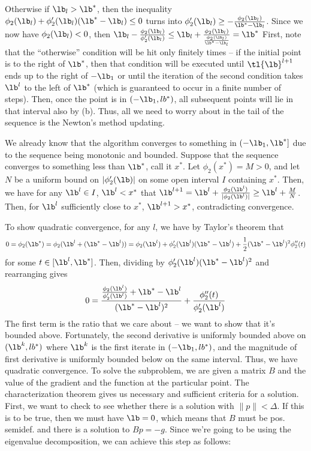\documentclass{article}
\begin{document}
Otherwise if $\lb_l>\lb^*$, then the inequality $\phi_2(\lb_l)+\phi_2'(\lb_l)(\lb^*-\lb_l)\leq0$ turns into $\phi_2'(\lb_l)\geq-\frac{\phi_2(\lb_l)}{\lb^*-\lb_l}$. Since we now have $\phi_2(\lb_l)<0$, then $\lb_l-\frac{\phi_2(\lb_l)}{\phi_2'(\lb_l)}\leq\lb_l+\frac{\phi_2(\lb_l)}{\frac{\phi_2(\lb_l)}{\lb^*-\lb_l}}=\lb^*$
First, note that the ``otherwise'' condition will be hit only finitely times -- if the initial point is to the right of $\lb^*$, then that condition will be executed until $\tl{\lb}^{l+1}$ ends up to the right of $-\lb_1$ or until the iteration of the second condition takes $\lb^l$ to the left of $\lb^*$ (which is guaranteed to occur in a finite number of steps). Then, once the point is in $(-\lb_1,lb^*)$, all subsequent points will lie in that interval also by (b). Thus, all we need to worry about in the tail of the sequence is the Newton's method updating.

We already know that the algorithm converges to something in $(-\lb_1, \lb^*]$ due to the sequence being monotonic and bounded. Suppose that the sequence converges to something less than $\lb^*$, call it $x^*$. Let $\phi_2(x^*)=M>0$, and let $N$ be a uniform bound on $|\phi_2'(\lb)|$ on some open interval $I$ containing $x^*$. Then, we have for any $\lb^l\in I$, $\lb^l<x^*$ that $\lb^{l+1}=\lb^l+\frac{\phi_2(\lb^l)}{|\phi_2(\lb^l)|}\geq\lb^l+\frac{M}{N}$. Then, for $\lb^l$ sufficiently close to $x^*$, $\lb^{l+1}>x^*$, contradicting convergence.

To show quadratic convergence, for any $l$, we have by Taylor's theorem that
\[0=\phi_2(\lb^*)=\phi_2(\lb^l+(\lb^*-\lb^l))=\phi_2(\lb^l)+\phi_2'(\lb^l)(\lb^*-\lb^l)+\frac{1}{2}(\lb^*-\lb^l)^2\phi_2''(t)\]
for some $t\in[\lb^l,\lb^*]$. Then, dividing by $\phi_2'(\lb^l)(\lb^*-\lb^l)^2$ and rearranging gives
\[0=\frac{\frac{\phi_2(\lb^l)}{\phi_2'(\lb^l)}+\lb^*-\lb^l}{(\lb^*-\lb^l)^2}+\frac{\phi_2''(t)}{\phi_2'(\lb^l)}\]
The first term is the ratio that we care about -- we want to show that it's bounded above. Fortunately, the second derivative is uniformly bounded above on $(\lb^k, lb^*)$ where $\lb^k$ is the first iterate in $(-\lb_1,lb^*)$, and the magnitude of first derivative is uniformly bounded below on the same interval. Thus, we have quadratic convergence.
To solve the subproblem, we are given a matrix $B$ and the value of the gradient and the function at the particular point. The characterization theorem gives us necessary and sufficient criteria for a solution. First, we want to check to see whether there is a solution with $\|p\|<\Delta$. If this is to be true, then we must have $\lb=0$, which means that $B$ must be pos. semidef. and there is a solution to $Bp=-g$. Since we're going to be using the eigenvalue decomposition, we can achieve this step as follows:
\end{document}
